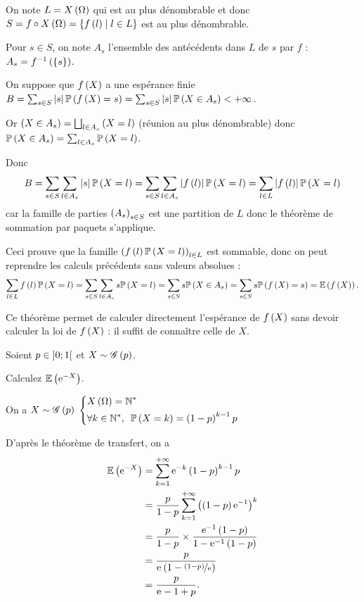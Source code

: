 \begin{dem}
On note \(L=X\left(\Omega\right)\) qui est au plus dénombrable et donc \(S=f\circ X\left(\Omega\right)=\left\lbrace f\left(l\right)\;\middle|\; l\in L\right\rbrace\) est au plus dénombrable.

Pour \(s\in S\), on note \(A_s\) l'ensemble des antécédents dans \(L\) de \(s\) par \(f\) : \(A_s=f^{-1}\left(\left\lbrace s\right\rbrace\right)\).

On suppose que \(f\left(X\right)\) a une espérance finie \ie \(B=\sum_{s\in S}\left\lvert s\right\rvert\mathbb{P}\left(f\left(X\right)=s\right)=\sum_{s\in S}\left\lvert s\right\rvert\mathbb{P}\left(X\in A_s\right)<+\infty\).

Or \(\left(X\in A_s\right)=\bigsqcup_{l\in A_s}\left(X=l\right)\) (réunion au plus dénombrable) donc \(\mathbb{P}\left(X\in A_s\right)=\sum_{l\in A_s}\mathbb{P}\left(X=l\right)\).

Donc \[B=\sum_{s\in S}\sum_{l\in A_s}\left\lvert s\right\rvert\mathbb{P}\left(X=l\right)=\sum_{s\in S}\sum_{l\in A_s}\left\lvert f\left(l\right)\right\rvert\mathbb{P}\left(X=l\right)=\sum_{l\in L}\left\lvert f\left(l\right)\right\rvert\mathbb{P}\left(X=l\right)\] car la famille de parties \(\left(A_s\right)_{s\in S}\) est une partition de \(L\) donc le théorème de sommation par paquets s'applique.

Ceci prouve que la famille \(\left(f\left(l\right)\mathbb{P}\left(X=l\right)\right)_{l\in L}\) est sommable, donc on peut reprendre les calculs précédents sans valeurs absolues : \[\sum_{l\in L}f\left(l\right)\mathbb{P}\left(X=l\right)=\sum_{s\in S}\sum_{l\in A_s}s\mathbb{P}\left(X=l\right)=\sum_{s\in S}s\mathbb{P}\left(X\in A_s\right)=\sum_{s\in S}s\mathbb{P}\left(f\left(X\right)=s\right)=\operatorname{\mathbb{E}}\left(f\left(X\right)\right).\]
\end{dem}

Ce théorème permet de calculer directement l'espérance de \(f\left(X\right)\) sans devoir calculer la loi de \(f\left(X\right)\) : il suffit de connaître celle de \(X\).

\begin{exo}
Soient \(p\in\left]0;1\right[\) et \(X\sim\mathscr{G}\left(p\right)\).

Calculez \(\operatorname{\mathbb{E}}\left(\mathrm{e}^{-X}\right)\).
\end{exo}

\begin{corr}
On a \(X\sim\mathscr{G}\left(p\right)\) \ie \(\begin{dcases}
X\paren{\Omega}=\Ns \\
\quantifs{\forall k\in\Ns}\proba{X=k}=\paren{1-p}^{k-1}p
\end{dcases}\)

D'après le théorème de transfert, on a \[\begin{aligned}
\operatorname{\mathbb{E}}\left(\mathrm{e}^{-X}\right)&=\sum_{k=1}^{+\infty}\mathrm{e}^{-k}\left(1-p\right)^{k-1}p \\
&=\dfrac{p}{1-p}\sum_{k=1}^{+\infty}\left(\left(1-p\right)\mathrm{e}^{-1}\right)^k \\
&=\dfrac{p}{1-p}\times\dfrac{\mathrm{e}^{-1}\left(1-p\right)}{1-\mathrm{e}^{-1}\left(1-p\right)} \\
&=\dfrac{p}{\mathrm{e}^{}\left(1-\nicefrac{\left(1-p\right)}{\mathrm{e}^{}}\right)} \\
&=\dfrac{p}{\mathrm{e}^{}-1+p}.
\end{aligned}\]
\end{corr}

